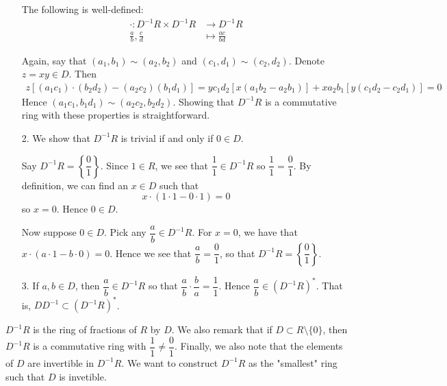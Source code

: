 \begin{prf}
\begin{itemize}
            \begin{lemma}
                The following is well-defined:
                \begin{align*}
                    \cdot: D^{-1}R \times D^{-1}R &\longrightarrow D^{-1}R\\
                    \frac{a}{b}, \frac{c}{d} &\longmapsto \frac{ac}{bd}
                \end{align*}
            \end{lemma}
            Again, say that $(a_1, b_1) \sim (a_2, b_2)$ and $(c_1, d_1)
            \sim (c_2, d_2)$. Denote $z = xy \in D$. Then 
            \begin{align*}
                z[(a_1c_1) \cdot(b_2d_2) - (a_2c_2)(b_1d_1)]
                =
                yc_1d_2[x(a_1b_2 - a_2b_1)]
                + 
                xa_2b_1[y(c_1d_2 - c_2d_1)]
                = 0
            \end{align*}
        Hence $(a_1c_1, b_1d_1) \sim (a_2c_2, b_2d_2)$. Showing
        that $D^{-1}R$ is a commutative ring with these properties
        is straightforward. 
    
            \item[2.] We show that $D^{-1}R$ is trivial if and only
            if $0 \in D$. 
    
            Say $D^{-1}R = \left\{\dfrac{0}{1}\right\}$. Since $1 \in R$, we see that
            $\dfrac{1}{1} \in D^{-1}R$ so $\dfrac{1}{1} = \dfrac{0}{1}$. By
            definition, we can find an $x \in D$ such that 
            \[
                x \cdot (1 \cdot 1 - 0 \cdot 1) = 0
            \]
            so $x = 0$. Hence $0 \in D$. 
    
            Now suppose $0 \in D$. Pick any $\dfrac{a}{b} \in D^{-1}R$.
            For $x = 0$, we have that $x \cdot (a \cdot 1 - b \cdot 0) =
            0$. Hence we see that $\dfrac{a}{b} = \dfrac{0}{1}$, so that
            $D^{-1}R = \left\{\dfrac{0}{1}\right\}$.
        
            \item[3.] If $a, b \in D$, then $\dfrac{a}{b} \in
            D^{-1}R$ so that $\dfrac{a}{b} \cdot \dfrac{b}{a} =
            \dfrac{1}{1}$. Hence $\dfrac{a}{b} \in (D^{-1}R)^{*}$. That
            is, $DD^{-1} \subset (D^{-1}R)^*$. 
        \end{itemize}
    \end{prf}
    $D^{-1}R$ is the ring of fractions of $R$ by $D$. We also
    remark that if $D \subset R \setminus \{0\}$, then $D^{-1}R$
    is a commutative ring with $\dfrac{1}{1} \ne \dfrac{0}{1}$.
    Finally, we also note that the elements of $D$ are invertible
    in $D^{-1}R$. We want to construct $D^{-1}R$ as the "smallest"
    ring such that $D$ is invetible.

